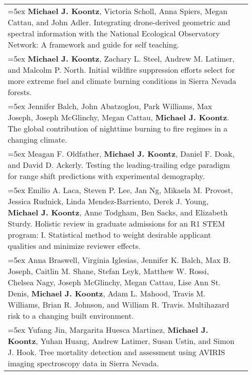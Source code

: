 \begin{longtable}{@{} >{\raggedright}p{5.25in} >{\raggedleft}X @{}}

\hangindent=5ex \textbf{Michael J. Koontz}, Victoria Scholl, Anna Spiers, Megan Cattau, and John Adler. Integrating drone-derived geometric and spectral information with the National Ecological Observatory Network: A framework and guide for self teaching. & [\textcolor{blue}{\href{https://github.com/mikoontz/neon-drone-workflow}{GitHub}}] \tabularnewline

\hangindent=5ex \textbf{Michael J. Koontz}, Zachary L. Steel, Andrew M. Latimer, and Malcolm P. North. Initial wildfire suppression efforts select for more extreme fuel and climate burning conditions in Sierra Nevada forests.  & [\textcolor{blue}{\href{https://github.com/mikoontz/selection-by-suppression}{GitHub}}] \tabularnewline

\hangindent=5ex Jennifer Balch, John Abatzoglou, Park Williams, Max Joseph, Joseph McGlinchy, Megan Cattau, \textbf{Michael J. Koontz}. The global contribution of nighttime burning to fire regimes in a changing climate. & \tabularnewline

\hangindent=5ex Meagan F. Oldfather, \textbf{Michael J. Koontz}, Daniel F. Doak, and David D. Ackerly. Testing the leading-trailing edge paradigm for range shift predictions with experimental demography. & \tabularnewline

\hangindent=5ex Emilio A. Laca, Steven P. Lee, Jan Ng, Mikaela M. Provost, Jessica Rudnick, Linda Mendez-Barriento, Derek J. Young, \textbf{Michael J. Koontz}, Anne Todgham, Ben Sacks, and Elizabeth Sturdy. Holistic review in graduate admissions for an R1 STEM program: I. Statistical method to weight desirable applicant qualities and minimize reviewer effects. & \tabularnewline

\hangindent=5ex Anna Braswell, Virginia Iglesias, Jennifer K. Balch, Max B. Joseph, Caitlin M. Shane, Stefan Leyk, Matthew W. Rossi, Chelsea Nagy, Joseph McGlinchy, Megan Cattau, Lise Ann St. Denis, \textbf{Michael J. Koontz}, Adam L. Mahood, Travis M. Williams, Brian R. Johnson, and William R. Travis. Multihazard risk to a changing built environment. \tabularnewline

\hangindent=5ex Yufang Jin, Margarita Huesca Martinez, \textbf{Michael J. Koontz}, Yuhan Huang, Andrew Latimer, Susan Ustin, and Simon J. Hook. Tree mortality detection and assessment using AVIRIS imaging spectroscopy data in Sierra Nevada. &


\end{longtable}


